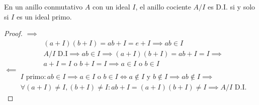 \begin{thm}
    En un anillo conmutativo $A$ con un ideal $I$, el anillo cociente $A / I$ es D.I. si y solo si $I$ es un ideal primo.
    \label{thm:di-primo}
\end{thm}

\begin{proof}
    $\implies$
    \begin{equation}
        \begin{split}
            & (a+I)(b+I) = ab + I = e + I \implies ab \in I\\
            & A / I \text{ D.I} \implies ab \in I \implies (a + I)(b + I) = ab + I = I \implies\\
            & a + I = I \text{ o } b + I = I \implies a \in I \text{ o } b \in I
        \end{split}
    \end{equation}
    $\impliedby$
    \begin{equation}
        \begin{split}
            & I \text{ primo} : ab \in I \implies a \in I \text{ o } b \in I \iff a \not\in I \text{ y } b \not\in I \implies ab \not\in I \implies\\
            & \forall (a + I) \neq I, (b + I) \neq I : ab + I = (a +I)(b + I) \neq I \implies A / I \text{ D.I.}
        \end{split}
    \end{equation}    
\end{proof}
